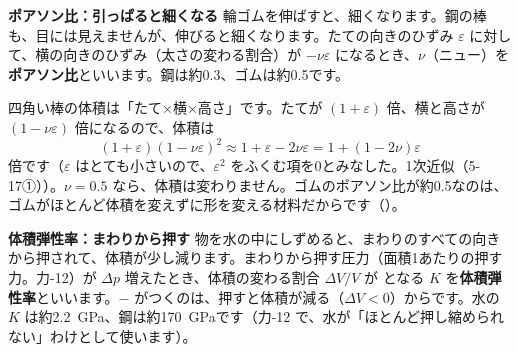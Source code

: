 \noindent\textbf{ポアソン比：引っぱると細くなる}\quad
輪ゴムを伸ばすと、細くなります。鋼の棒も、目には見えませんが、伸びると細くなります。たての向きのひずみ $\varepsilon$ に対して、横の向きのひずみ（太さの変わる割合）が $-\nu\varepsilon$ になるとき、$\nu$（ニュー）を\textbf{ポアソン比}といいます。鋼は約0.3、ゴムは約0.5です。
\begin{bkfigure}
\label{ph:力-8:fig-poisson}
\end{bkfigure}
四角い棒の体積は「たて×横×高さ」です。たてが $(1+\varepsilon)$ 倍、横と高さが $(1-\nu\varepsilon)$ 倍になるので、体積は
\[(1+\varepsilon)(1-\nu\varepsilon)^2\approx1+\varepsilon-2\nu\varepsilon=1+(1-2\nu)\varepsilon\]
倍です（$\varepsilon$ はとても小さいので、$\varepsilon^2$ をふくむ項を0とみなした。1次近似（5-17①））。$\nu=0.5$ なら、体積は変わりません。ゴムのポアソン比が約0.5なのは、ゴムがほとんど体積を変えずに形を変える材料だからです（）。

\noindent\textbf{体積弾性率：まわりから押す}\quad
物を水の中にしずめると、まわりのすべての向きから押されて、体積が少し減ります。まわりから押す圧力（面積1あたりの押す力。力-12）が $\Delta p$ 増えたとき、体積の変わる割合 $\Delta V/V$ が
となる $K$ を\textbf{体積弾性率}といいます。$-$ がつくのは、押すと体積が減る（$\Delta V<0$）からです。水の $K$ は約\qty{2.2}{GPa}、鋼は約\qty{170}{GPa}です（力-12 で、水が「ほとんど押し縮められない」わけとして使います）。

